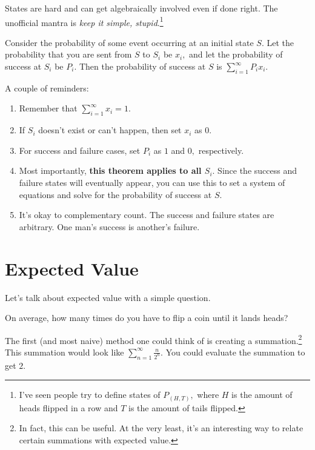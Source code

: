 \documentclass[mast]{lucky}
\begin{document}
States are hard and can get algebraically involved even if done right. The unofficial mantra is \textit{keep it simple, stupid}.\footnote{I've seen people try to define states of $P_{(H,T)},$ where $H$ is the amount of heads flipped in a row and $T$ is the amount of tails flipped.}
\begin{theo}
Consider the probability of some event occurring at an initial state $S.$ Let the probability that you are sent from $S$ to $S_i$ be $x_i,$ and let the probability of success at $S_i$ be $P_i.$ Then the probability of success at $S$ is $\sum\limits_{i=1}^{\infty}P_ix_i.$
\end{theo}

A couple of reminders:

\begin{enumerate}
    \item Remember that $\sum\limits_{i=1}^{\infty}x_i=1.$
    
    \item If $S_i$ doesn't exist or can't happen, then set $x_i$ as $0.$
    
    \item For success and failure cases, set $P_i$ as $1$ and $0,$ respectively.
    
    \item Most importantly, \textbf{this theorem applies to all $S_i.$} Since the success and failure states will eventually appear, you can use this to set a system of equations and solve for the probability of success at $S.$
    
    \item It's okay to complementary count. The success and failure states are arbitrary. One man's success is another's failure.
\end{enumerate}
\section{Expected Value}

Let's talk about expected value with a simple question.

\begin{exam}
On average, how many times do you have to flip a coin until it lands heads?
\end{exam}

The first (and most naive) method one could think of is creating a summation.\footnote{In fact, this can be useful. At the very least, it's an interesting way to relate certain summations with expected value.} This summation would look like $\sum_{n=1}^{\infty}\frac{n}{2^n}.$ You could evaluate the summation to get $2.$
\end{document}
